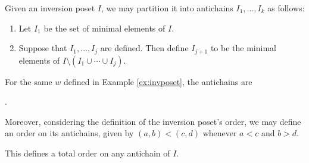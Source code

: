 \documentclass{article}
\begin{document}
Given an inversion poset $I$, we may partition it into antichains $I_1, \ldots, I_k$ as follows:
\begin{enumerate}
    \item Let $I_1$ be the set of minimal elements of $I$.
    \item Suppose that $I_1, \ldots, I_j$ are defined. 
        Then define $I_{j+1}$ to be the minimal elements of $I \setminus (I_1 \cup \cdots \cup I_j)$.
\end{enumerate}

\begin{example}\label{ex:invposetantichains}
    For the same $w$ defined in Example \ref{ex:invposet}, the antichains are
    \begin{center}
        .
    \end{center}
\end{example}

Moreover, considering the definition of the inversion poset's order, we may define an order on its antichains, given by $(a,b) < (c,d)$ whenever $a < c$ and $b > d$.

This defines a total order on any antichain of $I$.
\end{document}
